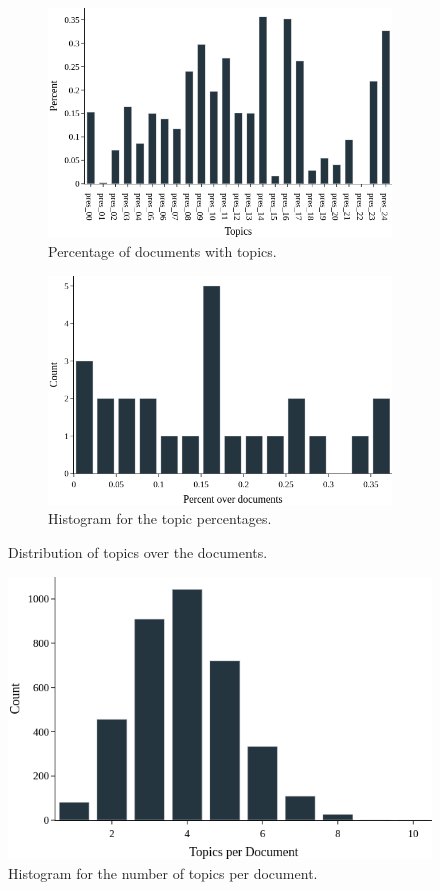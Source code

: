 \begin{figure}[h!]
	\begin{subfigure}{0.49\textwidth}
		\includegraphics[width=\linewidth]{01.Chapters/05.Results/pres-percentage-bar}
		\caption{Percentage of documents with topics.}
		\label{fig:pres-percentage-bar}
	\end{subfigure}%
	\hfill
	\begin{subfigure}{0.49\textwidth}
		\includegraphics[width=\linewidth]{01.Chapters/05.Results/pres-percentage-hist}
		\caption{Histogram for the topic percentages.}
		\label{fig:pres-percentage-hist}
	\end{subfigure}%
	\caption{Distribution of topics over the documents.}
	\label{fig:pres-topic-dist}
\end{figure}

\begin{figure}[h!]
	\centering
	\includegraphics[width=0.55\linewidth]{01.Chapters/05.Results/pres-topic-per-doc}
	\caption{Histogram for the number of topics per document.}
	\label{fig:pres-topic-per-doc}
\end{figure}

